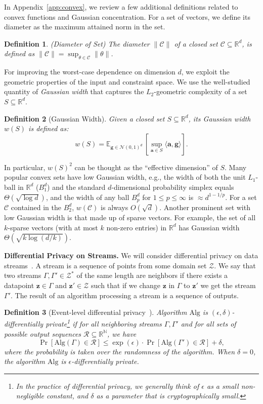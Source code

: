 \documentclass{article}
\theoremstyle{plain}
\newtheorem{definition}{Definition}
\def \eps {\epsilon}
\def \z {\mathbf z}
\def \CCC {\mathcal{C}}
\def \RRR {\mathcal{R}}
\def \ZZZ {\mathcal{Z}}
\def \NNN {\mathcal{N}}
\def \E {\mathbb{E}}
\def \N {\mathbb N}
\def \Alg {\mathrm{Alg}}
\def \a {\mathbf a}
\def \g {\mathbf g}
\def \R {\mathbb{R}}
\def \N {\mathbb{N}}
\begin{document}
In Appendix~\ref{app:convex}, we review a few additional definitions related to convex functions and Gaussian concentration. For a set of vectors, we define its diameter as the maximum attained norm in the set.
\begin{definition} \label{defn:diameter}
(Diameter of Set) The diameter $\|\CCC\|$ of a closed set $\CCC \subseteq \R^d$, is defined as $\| \CCC \| = \sup_{\theta \in \CCC} \| \theta \|$.
\end{definition}

For improving the worst-case dependence on dimension $d$, we exploit the geometric properties of the input and constraint space. We use the well-studied quantity of {\em Gaussian width} that captures the $L_2$-geometric complexity of a set $S \subseteq \R^d$. 
\begin{definition} [Gaussian Width]
Given a closed set $S \subseteq \R^d$, its Gaussian width $w(S)$ is defined as: 
$$w(S)=\E_{\g \in \NNN(0,1)^d}\, [\sup_{\a \in S} \langle \a, \g \rangle].$$
\end{definition} 
In particular, $w(S)^2$ can be thought as the ``effective dimension'' of $S$. Many popular convex sets have low Gaussian width, e.g., the width of both the unit $L_1$-ball in $\R^d$ ($B_1^d$) and the standard $d$-dimensional probability simplex equals $\Theta(\sqrt{\log d})$, and the width of any ball $B_p^d$ for $1 \leq p \leq \infty$ is $\approx d^{1-1/p}$. For a set $\CCC$ contained in the $B_2^d$, $w(\CCC)$ is always $O(\sqrt{d})$. Another prominent set with low Gaussian width is that made up of sparse vectors. For example, the set of all $k$-sparse vectors (with at most $k$ non-zero entries) in $\R^d$ has Gaussian width $\Theta(\sqrt{k \log(d/k)})$.

\smallskip
\noindent\textbf{Differential Privacy on Streams.} We will consider differential privacy on data streams~\cite{DNPR10}. A stream is a sequence of points from some domain set $\ZZZ$. We say that two streams $\Gamma, \Gamma' \in \ZZZ^\ast$ of the same length are neighbors if there exists a datapoint $\z \in \Gamma$ and $\z' \in \ZZZ$ such that if we change $\z$ in $\Gamma$ to $\z'$ we get the stream $\Gamma'$. The result of an algorithm processing a stream is a sequence of outputs.

\begin{definition}[Event-level differential privacy~\cite{DMNS06,DNPR10}]\label{defn:dp}
Algorithm $\Alg$ is $(\epsilon,\delta)$-differentially private\footnote{In the practice of differential privacy, we generally think of $\eps$ as a small non-negligible constant, and $\delta$ as a parameter that is cryptographically small.} if for all neighboring streams $\Gamma, \Gamma'$ and for all sets of possible output sequences $\RRR \subseteq \R^\N$, we have
$$\Pr[\Alg(\Gamma) \in \RRR] \leq \exp(\epsilon) \cdot \Pr[\Alg(\Gamma') \in \RRR] + \delta,$$
where the probability is taken over the randomness of the algorithm.  When $\delta=0$, the algorithm $\Alg$ is $\eps$-differentially private.
\end{definition}
\end{document}
